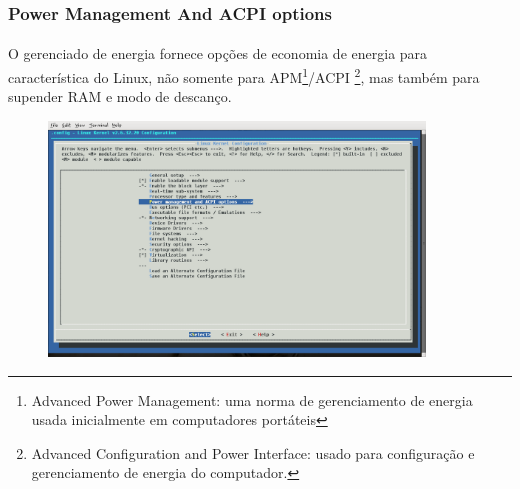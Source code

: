 \documentclass[a4paper,10pt]{article}
\begin{document}
  \subsubsection{Power Management And ACPI options}
  \paragraph{}
  O gerenciado de energia fornece opções de economia de energia para característica do Linux, não somente para 
  APM\footnote{Advanced Power Management: uma norma de gerenciamento de energia usada inicialmente em computadores portáteis}/ACPI
  \footnote{Advanced Configuration and Power Interface: usado para configuração e gerenciamento de energia do computador.}, 
  mas também para supender RAM e modo de descanço.
  \begin{figure}[ht]
  \center
  \includegraphics[width=10cm]{images/PowerManagementAndACPIoptions.png}
  \end{figure}
\end{document}
